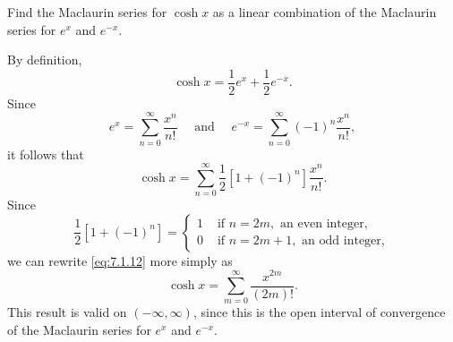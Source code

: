 \setcounter{example}{4}
\begin{example}
  \label{example:7.1.5} \rm Find the Maclaurin series for $\cosh x$ as a linear combination of the
  Maclaurin series for $e^{x}$ and $e^{-x}$.
\end{example}
\setcounter{equation}{11}
\begin{examplesolution}
\solution By definition,
\[
  \cosh x=\frac{1}{2}e^{x}+\frac{1}{2}e^{-x}.
\]
Since
\[
  e^{x}=\sum_{n=0}^{\infty}\frac{x^{n}}{n!}\quad\mbox{ and }\quad e^{-x}=\sum_{n=0}^{\infty}(-1)^{n}\frac{x^{n}}{n!},
\]
it follows that
\begin{equation}
  \label{eq:7.1.12}\cosh x=\sum_{n=0}^{\infty}\frac{1}{2}[1+(-1)^{n}]{\frac{x^{n}}{n!}}.
\end{equation}
Since
\[
  \frac{1}{2}[1+(-1)^{n}]=\left\{
  \begin{array}{cl}
    1 & \mbox{ if }n=2m,\mbox{ an even integer},  \\
    0 & \mbox{ if }n=2m+1,\mbox{ an odd integer},
  \end{array}\right.
\]
we can rewrite \eqref{eq:7.1.12} more simply as
\[
  \cosh x=\sum_{m=0}^{\infty}\frac{x^{2m}}{(2m)!}.
\]
This result is valid on $(-\infty,\infty)$, since this is the open interval of convergence of the
Maclaurin series for $e^{x}$ and $e^{-x}$.
\end{examplesolution}

